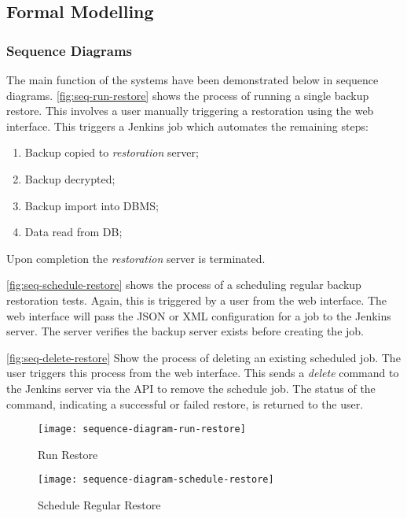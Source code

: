 	\subsection{Formal Modelling}
	\subsubsection{Sequence Diagrams}
		The main function of the systems have been demonstrated below in sequence diagrams. \autoref{fig:seq-run-restore} shows the process of running a single backup restore. This involves a user manually triggering a restoration using the web interface. This triggers a Jenkins job which automates the remaining steps:
		\begin{enumerate}
			\item Backup copied to \textit{restoration} server;
			\item Backup decrypted;
			\item Backup import into DBMS;
			\item Data read from DB;
		\end{enumerate}
		Upon completion the \textit{restoration} server is terminated.

		\autoref{fig:seq-schedule-restore} shows the process of a scheduling regular backup restoration tests. Again, this is triggered by a user from the web interface. The web interface will pass the JSON or XML configuration for a job to the Jenkins server. The server verifies the backup server exists before creating the job.
		
		\autoref{fig:seq-delete-restore} Show the process of deleting an existing scheduled job. The user triggers this process from the web interface. This sends a \textit{delete} command to the Jenkins server via the API to remove the schedule job. The status of the command, indicating a successful or failed restore, is returned to the user.
		
		\begin{figure}[H]
			\setlength{\belowcaptionskip}{15pt plus 3pt minus 2pt}
			\caption{Run Restore}
			\centering
			\texttt{[image: sequence-diagram-run-restore]}
			\label{fig:seq-run-restore}
		\end{figure}
		
		\begin{figure}[H]
			\setlength{\belowcaptionskip}{15pt plus 3pt minus 2pt}
			\caption{Schedule Regular Restore}
			\centering
			\texttt{[image: sequence-diagram-schedule-restore]}
			\label{fig:seq-schedule-restore}
		\end{figure}
		
